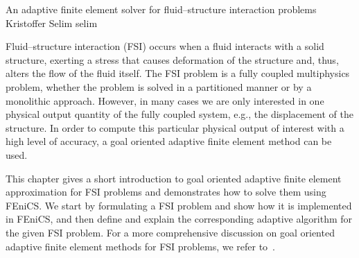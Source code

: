               {An adaptive finite element solver for fluid--structure interaction problems}
              {Kristoffer Selim}
              {selim}
\newcommand{\subdt}{\textrm{d}_t}
\newcommand{\divv}{\textrm{div}\;}
\newcommand{\Divv}{\textrm{Div}\;}
\newcommand{\uF}{u_{_{F}}}
\newcommand{\dotuF}{\dot{u}_{_{F}}}
\newcommand{\pF}{p_{_{F}}}
\newcommand{\rhoF}{\rho_{_{F}}}
\newcommand{\sigmaF}{\sigma_{_{F}}}
\newcommand{\sigmaFup}{\sigma_{_{F}}(u_{_{F}}, p_{_{F}})}
\newcommand{\sigmaS}{\sigma_{_{S}}}
\newcommand{\bff}{b_{_{F}}}
\newcommand{\graduF}{\textrm{grad}\;u_{_{F}}}
\newcommand{\US}{U_{_{S}}}
\newcommand{\uS}{u_{_{S}}}
\newcommand{\GradUS}{\textrm{Grad}\;U_{_{S}}}
\newcommand{\ddotUS}{\ddot{U}_{_{S}}}
\newcommand{\ddotuS}{\ddot{u}_{_{S}}}
\newcommand{\PS}{P_{_{S}}}
\newcommand{\rhoS}{\rho_{_{S}}}
\newcommand{\SigmaS}{\Sigma_{_{S}}}
\newcommand{\SigmaSU}{\Sigma_{_{S}}(U_{_{S}})}
\newcommand{\BS}{B_{_{S}}}
\newcommand{\M}{\mathcal{M}}
\newcommand{\E}{\mathcal{E}}
\newcommand{\oF}{\omega_{_{F}}}
\newcommand{\oS}{\omega_{_{S}}}
\newcommand{\OS}{\Omega_{_{S}}}
\newcommand{\OF}{\Omega_{_{F}}}
\newcommand{\PhiS}{\Phi_{_{S}}}
\newcommand{\PhiM}{\Phi_{_{M}}}
\newcommand{\FS}{F_{_{S}}}
\newcommand{\UM}{U_{_{M}}}
\newcommand{\SigmaM}{\Sigma_{_{M}}}
\newcommand{\GradUM}{\textrm{Grad}\;U_{_{M}}}
\newcommand{\UF}{U_{_{F}}}
\newcommand{\PF}{P_{_{F}}}
\newcommand{\AFF}{A_{_{FF}}}
\newcommand{\AFS}{A_{_{FS}}}
\newcommand{\AFM}{A_{_{FM}}}
\newcommand{\ASS}{A_{_{SS}}}
\newcommand{\ASF}{A_{_{SF}}}
\newcommand{\ASM}{A_{_{SM}}}
\newcommand{\AMM}{A_{_{MM}}}
\newcommand{\AMF}{A_{_{MF}}}
\newcommand{\AMS}{A_{_{MS}}}

Fluid--structure interaction (FSI) occurs when a fluid interacts with
a solid structure, exerting a stress that causes deformation of the
structure and, thus, alters the flow of the fluid itself.
The FSI problem is a fully
coupled multiphysics problem, whether the problem is solved in a
partitioned manner or by a monolithic approach. However, in many cases
we are only interested in one physical output quantity of the fully
coupled system, e.g., the displacement of the structure. In order to
compute this particular physical output of interest with a high level
of accuracy, a goal oriented adaptive finite element method can be
used.

This chapter gives a short introduction to goal oriented adaptive
finite element approximation for FSI problems and demonstrates how to
solve them using FEniCS. We start by formulating a FSI problem and
show how it is implemented in FEniCS, and then define and explain the
corresponding adaptive algorithm for the given FSI problem. For a more
comprehensive discussion on goal oriented adaptive finite element
methods for FSI problems, we refer
to~\citet{SelimNarayananEtAl2010,Dunne2007,GratschBathe2006,BengzonLarson2010,Van2009,FickZeeBrummelen2008}.

